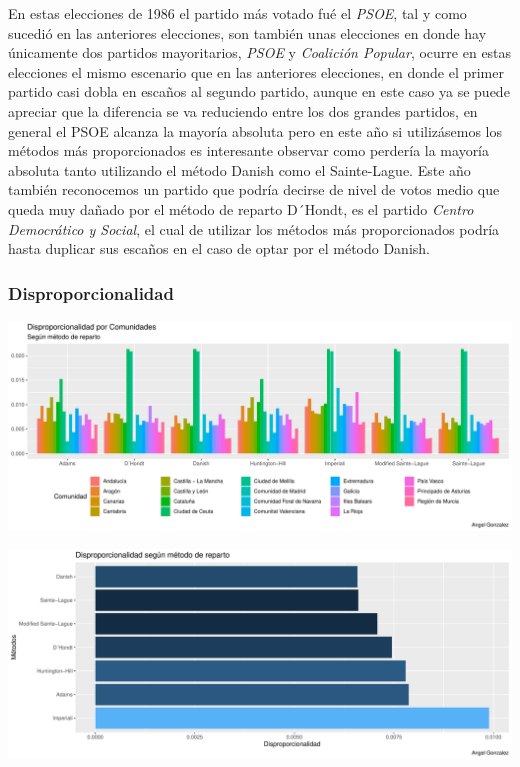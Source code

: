 \documentclass[12pt,a4paper,]{book}
\numberwithin{dummy}{section}
\theoremstyle{ocrenumbox}
\theoremstyle{blacknumex}
\theoremstyle{blacknumbox}
\theoremstyle{ocrenum}
\theoremstyle{ocrenum}
\begin{document}
En estas elecciones de 1986 el partido más votado fué el \emph{PSOE},
tal y como sucedió en las anteriores elecciones, son también unas
elecciones en donde hay únicamente dos partidos mayoritarios,
\emph{PSOE} y \emph{Coalición Popular}, ocurre en estas elecciones el
mismo escenario que en las anteriores elecciones, en donde el primer
partido casi dobla en escaños al segundo partido, aunque en este caso ya
se puede apreciar que la diferencia se va reduciendo entre los dos
grandes partidos, en general el PSOE alcanza la mayoría absoluta pero en
este año si utilizásemos los métodos más proporcionados es interesante
observar como perdería la mayoría absoluta tanto utilizando el método
Danish como el Sainte-Lague. Este año también reconocemos un partido que
podría decirse de nivel de votos medio que queda muy dañado por el
método de reparto D´Hondt, es el partido \emph{Centro Democrático y
Social}, el cual de utilizar los métodos más proporcionados podría hasta
duplicar sus escaños en el caso de optar por el método Danish.

\hypertarget{disproporcionalidad-3}{%
\subsubsection{Disproporcionalidad}\label{disproporcionalidad-3}}

\begin{center}\includegraphics[width=0.95\linewidth]{figurasR/unnamed-chunk-87-1} \end{center}

\begin{center}\includegraphics[width=0.95\linewidth]{figurasR/unnamed-chunk-87-2} \end{center}
\end{document}
